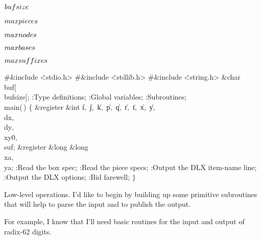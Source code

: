 \Y\B\4\D$\\{bufsize}$ \5
\par
\B\4\D$\\{maxpieces}$ \5
\par
\B\4\D$\\{maxnodes}$ \5
\par
\B\4\D$\\{maxbases}$ \5
\par
\B\4\D$\\{maxsuffixes}$ \5
\par
\Y\B\8\#\&{include} \.{<stdio.h>}\6
\8\#\&{include} \.{<stdlib.h>}\6
\8\#\&{include} \.{<string.h>}\6
\&{char} \\{buf}[\\{bufsize}];\7
:Type definitions\X;\6
:Global variables\X;\6
:Subroutines\X;\7
\\{main}(\,)\1\1\2\2\6
${}\{{}$\1\6
\&{register} \&{int} \|i${},{}$ \|j${},{}$ \|k${},{}$ \|p${},{}$ \|q${},{}$ %
\|r${},{}$ \|t${},{}$ \|x${},{}$ \|y${},{}$ \\{dx}${},{}$ \\{dy}${},{}$ %
\\{xy0}${},{}$ \\{suf};\6
\&{register} \&{long} \&{long} \\{xa}${},{}$ \\{ya};\7
:Read the box spec\X;\6
:Read the piece specs\X;\6
:Output the {\mc DLX} item-name line\X;\6
:Output the {\mc DLX} options\X;\6
:Bid farewell\X;\6
\4${}\}{}$\2\par
\fi

Low-level operations.
I'd like to begin by building up some primitive subroutines that will help
to parse the input and to publish the output.

For example, I know that
I'll need basic routines for the input and output of radix-62 digits.

